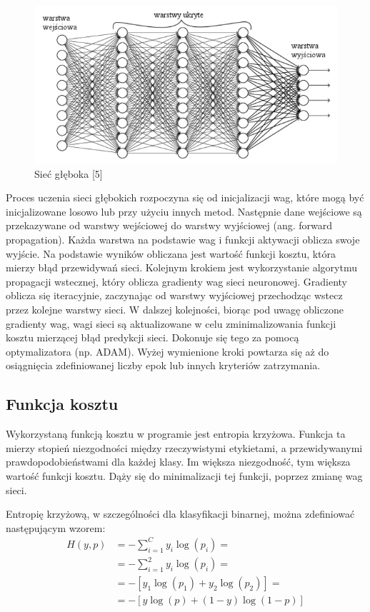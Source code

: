 \documentclass{article}
\begin{document}
\begin{figure}[H]
    \centering
    \includegraphics[width=1\textwidth, keepaspectratio]{siec_gleboka.png}
    \caption{Sieć głęboka [5]}
    \label{fig:siec}
\end{figure}

Proces uczenia sieci głębokich rozpoczyna się od inicjalizacji wag, które mogą być inicjalizowane losowo lub przy użyciu innych metod.
Następnie dane wejściowe są przekazywane od warstwy wejściowej do warstwy wyjściowej (ang. forward propagation).
Każda warstwa na podstawie wag i funkcji aktywacji oblicza swoje wyjście.
Na podstawie wyników obliczana jest wartość funkcji kosztu, która mierzy błąd przewidywań sieci.
Kolejnym krokiem jest wykorzystanie algorytmu propagacji wstecznej, który oblicza gradienty wag sieci neuronowej.
Gradienty oblicza się iteracyjnie, zaczynając od warstwy wyjściowej przechodząc wstecz przez kolejne warstwy sieci.
W dalszej kolejności, biorąc pod uwagę obliczone gradienty wag, wagi sieci są aktualizowane w celu zminimalizowania funkcji kosztu mierzącej błąd predykcji sieci.
Dokonuje się tego za pomocą optymalizatora (np. ADAM).
Wyżej wymienione kroki powtarza się aż do osiągnięcia zdefiniowanej liczby epok lub innych kryteriów zatrzymania.
\subsection{Funkcja kosztu}
Wykorzystaną funkcją kosztu w programie jest entropia krzyżowa.
Funkcja ta mierzy stopień niezgodności między rzeczywistymi etykietami, a przewidywanymi prawdopodobieństwami dla każdej klasy.
Im większa niezgodność, tym większa wartość funkcji kosztu.
Dąży się do minimalizacji tej funkcji, poprzez zmianę wag sieci.

Entropię krzyżową, w szczególności dla klasyfikacji binarnej, można zdefiniować następującym wzorem:
\begin{align*}
    H(y, p) & = -\sum_{i=1}^{C} y_i \log(p_i) =    \\
            & = -\sum_{i=1}^{2} y_i \log(p_i) =    \\
            & = -[y_1 \log(p_1) + y_2 \log(p_2)] = \\
            & = - [y \log(p) + (1-y) \log(1-p)]
\end{align*}
\end{document}
